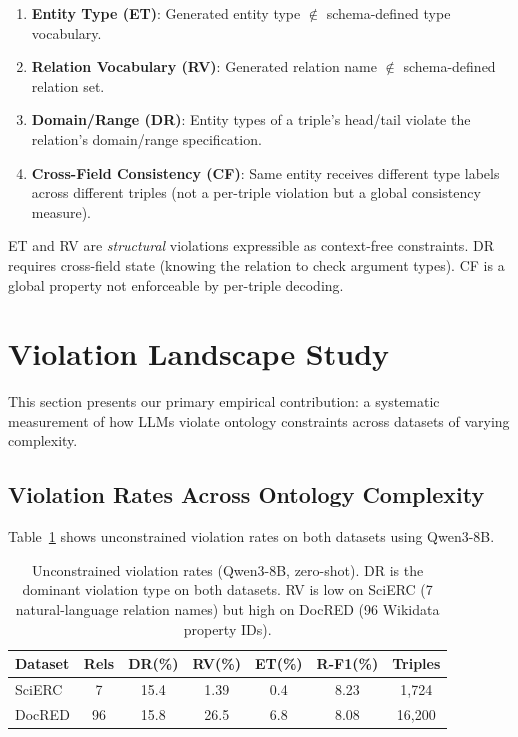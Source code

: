 \documentclass[11pt,a4paper]{article}
\begin{document}
\begin{enumerate}
\item \textbf{Entity Type (ET)}: Generated entity type $\notin$ schema-defined type vocabulary.
\item \textbf{Relation Vocabulary (RV)}: Generated relation name $\notin$ schema-defined relation set.
\item \textbf{Domain/Range (DR)}: Entity types of a triple's head/tail violate the relation's domain/range specification.
\item \textbf{Cross-Field Consistency (CF)}: Same entity receives different type labels across different triples (not a per-triple violation but a global consistency measure).
\end{enumerate}

ET and RV are \emph{structural} violations expressible as context-free constraints.
DR requires cross-field state (knowing the relation to check argument types).
CF is a global property not enforceable by per-triple decoding.

\section{Violation Landscape Study}
\label{sec:landscape}

This section presents our primary empirical contribution: a systematic measurement of how LLMs violate ontology constraints across datasets of varying complexity.

\subsection{Violation Rates Across Ontology Complexity}
\label{sec:rates}

Table~\ref{tab:unconstrained} shows unconstrained violation rates on both datasets using Qwen3-8B.

\begin{table}[t]
\centering
\caption{Unconstrained violation rates (Qwen3-8B, zero-shot). DR is the dominant violation type on both datasets. RV is low on SciERC (7 natural-language relation names) but high on DocRED (96 Wikidata property IDs).}
\label{tab:unconstrained}
\begin{tabular}{lcccccc}
\toprule
\textbf{Dataset} & \textbf{Rels} & \textbf{DR(\%)}  & \textbf{RV(\%)}  & \textbf{ET(\%)} & \textbf{R-F1(\%)} & \textbf{Triples} \\
\midrule
SciERC  & 7  & 15.4 & 1.39 & 0.4 & 8.23 & 1,724 \\
DocRED  & 96 & 15.8 & 26.5 & 6.8 & 8.08 & 16,200 \\
\bottomrule
\end{tabular}
\end{table}
\end{document}
